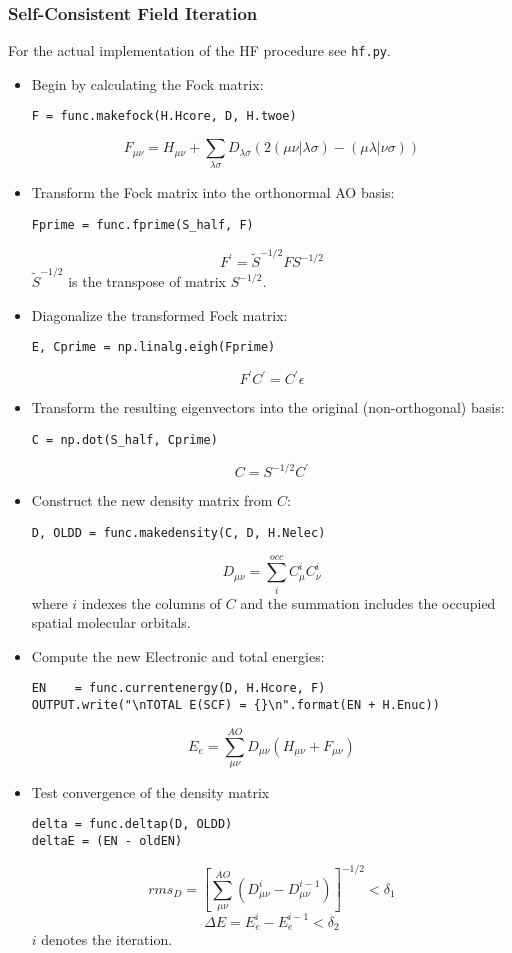 \documentclass[a4paper]{article}
\begin{document}
\subsubsection{Self-Consistent Field Iteration}
For the actual implementation of the HF procedure see \texttt{hf.py}.
\begin{itemize}
\item Begin by calculating the Fock matrix:
\begin{verbatim}
F = func.makefock(H.Hcore, D, H.twoe)
\end{verbatim}
$$
F_{\mu\nu} = H_{\mu\nu} + \sum_{\lambda\sigma} D_{\lambda\sigma} \left( 2 (\mu\nu |\lambda\sigma) - (\mu\lambda |\nu\sigma)\right)
$$

\item Transform the Fock matrix into the orthonormal AO basis:
\begin{verbatim}
Fprime = func.fprime(S_half, F)
\end{verbatim}
$$
F^' = \tilde{S}^{-1/2} F S^{-1/2}
$$
$\tilde{S}^{-1/2}$ is the transpose of matrix $S^{-1/2}$.

\item Diagonalize the transformed Fock matrix:
\begin{verbatim}
E, Cprime = np.linalg.eigh(Fprime)
\end{verbatim}
$$
F^' C^' = C^' \epsilon
$$

\item Transform the resulting eigenvectors into the original (non-orthogonal) basis:
\begin{verbatim}
C = np.dot(S_half, Cprime)
\end{verbatim}
$$
C = S^{-1/2} C^'
$$

\item Construct the new density matrix from $C$:
\begin{verbatim}
D, OLDD = func.makedensity(C, D, H.Nelec)
\end{verbatim}
$$
D_{\mu\nu} = \sum^{occ}_i C^{i}_{\mu} C^{i}_{\nu}
$$
where $i$ indexes the columns of $C$ and the summation includes the occupied spatial molecular orbitals.

\item Compute the new Electronic and total energies:
\begin{verbatim}
EN    = func.currentenergy(D, H.Hcore, F)
OUTPUT.write("\nTOTAL E(SCF) = {}\n".format(EN + H.Enuc))
\end{verbatim}
$$
E_e = \sum^{AO}_{\mu\nu} D_{\mu\nu} \left( H_{\mu\nu} + F_{\mu\nu} \right)
$$

\item Test convergence of the density matrix
\begin{verbatim}
delta = func.deltap(D, OLDD)
deltaE = (EN - oldEN)
\end{verbatim}
$$
rms_D = \left[ \sum^{AO}_{\mu\nu} \left( D^{i}_{\mu\nu} - D^{i-1}_{\mu\nu} \right) \right]^{-1/2} < \delta_1
$$
$$
\Delta E = E^{i}_{e} - E^{i-1}_{e} < \delta_2
$$
$i$ denotes the iteration.

\end{itemize}
\end{document}
